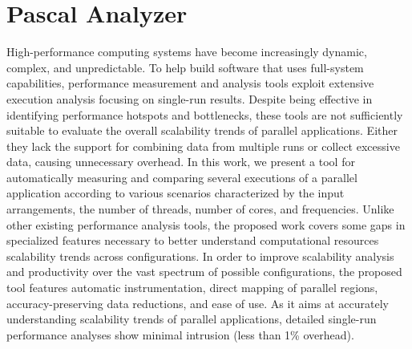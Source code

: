 \section{Pascal Analyzer} \label{sec:pascal_analyzer}
High-performance computing systems have become increasingly dynamic, complex, and unpredictable. To help build software that uses full-system capabilities, performance measurement and analysis tools exploit extensive execution analysis focusing on single-run results. Despite being effective in identifying performance hotspots and bottlenecks, these tools are not sufficiently suitable to evaluate the overall scalability trends of parallel applications. Either they lack the support for combining data from multiple runs or collect excessive data, causing unnecessary overhead. 
In this work, we present a tool for automatically measuring and comparing several executions of a parallel application according to various scenarios characterized by the input arrangements, the number of threads, number of cores, and frequencies.
Unlike other existing performance analysis tools, the proposed work covers some gaps in specialized features necessary to better understand computational resources scalability trends across configurations. 
In order to improve scalability analysis and productivity over the vast spectrum of possible configurations, the proposed tool features automatic instrumentation, direct mapping of parallel regions, accuracy-preserving data reductions, and ease of use.
As it aims at accurately understanding scalability trends of parallel applications, detailed single-run performance analyses show minimal intrusion (less than 1\% overhead).

